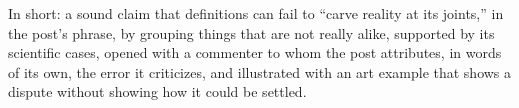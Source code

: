 \begin{afterword}
In short: a sound claim that definitions can fail to ``carve reality at its joints,'' in the post's phrase, by grouping things that are not really alike, supported by its scientific cases, opened with a commenter to whom the post attributes, in words of its own, the error it criticizes, and illustrated with an art example that shows a dispute without showing how it could be settled.
\end{afterword}
